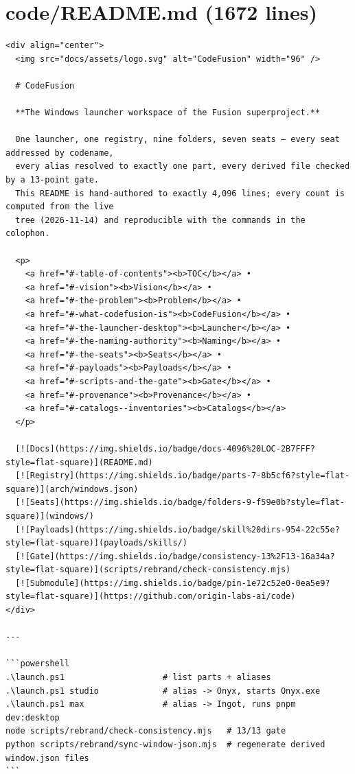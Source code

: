 \section*{code/README.md (1672 lines)}
\begingroup\begin{Verbatim}[breaklines,breakanywhere,fontsize=\footnotesize]
<div align="center">
  <img src="docs/assets/logo.svg" alt="CodeFusion" width="96" />

  # CodeFusion

  **The Windows launcher workspace of the Fusion superproject.**

  One launcher, one registry, nine folders, seven seats — every seat addressed by codename,
  every alias resolved to exactly one part, every derived file checked by a 13-point gate.
  This README is hand-authored to exactly 4,096 lines; every count is computed from the live
  tree (2026-11-14) and reproducible with the commands in the colophon.

  <p>
    <a href="#-table-of-contents"><b>TOC</b></a> •
    <a href="#-vision"><b>Vision</b></a> •
    <a href="#-the-problem"><b>Problem</b></a> •
    <a href="#-what-codefusion-is"><b>CodeFusion</b></a> •
    <a href="#-the-launcher-desktop"><b>Launcher</b></a> •
    <a href="#-the-naming-authority"><b>Naming</b></a> •
    <a href="#-the-seats"><b>Seats</b></a> •
    <a href="#-payloads"><b>Payloads</b></a> •
    <a href="#-scripts-and-the-gate"><b>Gate</b></a> •
    <a href="#-provenance"><b>Provenance</b></a> •
    <a href="#-catalogs--inventories"><b>Catalogs</b></a>
  </p>

  [![Docs](https://img.shields.io/badge/docs-4096%20LOC-2B7FFF?style=flat-square)](README.md)
  [![Registry](https://img.shields.io/badge/parts-7-8b5cf6?style=flat-square)](arch/windows.json)
  [![Seats](https://img.shields.io/badge/folders-9-f59e0b?style=flat-square)](windows/)
  [![Payloads](https://img.shields.io/badge/skill%20dirs-954-22c55e?style=flat-square)](payloads/skills/)
  [![Gate](https://img.shields.io/badge/consistency-13%2F13-16a34a?style=flat-square)](scripts/rebrand/check-consistency.mjs)
  [![Submodule](https://img.shields.io/badge/pin-1e72c52e0-0ea5e9?style=flat-square)](https://github.com/origin-labs-ai/code)
</div>

---

```powershell
.\launch.ps1                    # list parts + aliases
.\launch.ps1 studio             # alias -> Onyx, starts Onyx.exe
.\launch.ps1 max                # alias -> Ingot, runs pnpm dev:desktop
node scripts/rebrand/check-consistency.mjs   # 13/13 gate
python scripts/rebrand/sync-window-json.mjs  # regenerate derived window.json files
```


\end{Verbatim}
